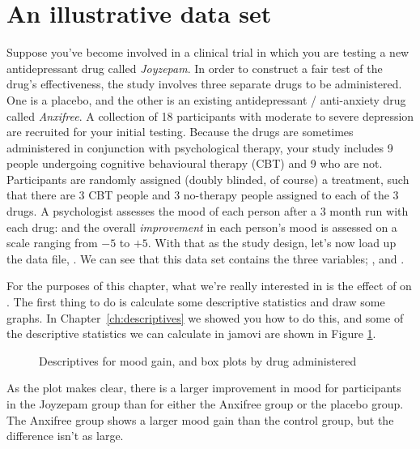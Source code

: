\section{An illustrative data set~\label{sec:anxifree}}

Suppose you've become involved in a clinical trial in which you are testing a new antidepressant drug called {\it Joyzepam}. In order to construct a fair test of the drug's effectiveness, the study involves three separate drugs to be administered. One is a placebo, and the other is an existing antidepressant / anti-anxiety drug called {\it Anxifree}. A collection of 18 participants with moderate to severe depression are recruited for your initial testing. Because the drugs are sometimes administered in conjunction with psychological therapy, your study includes 9 people undergoing cognitive behavioural therapy (CBT) and 9 who are not. Participants are randomly assigned (doubly blinded, of course) a treatment, such that there are 3 CBT people and 3 no-therapy people assigned to each of the 3 drugs. A psychologist assesses the mood of each person after a 3 month run with each drug: and the overall {\it improvement} in each person's mood is assessed on a scale ranging from $-5$ to $+5$.  With that as the study design, let's now load up the data file, . We can see that this data set contains the three variables; ,  and . 

For the purposes of this chapter, what we're really interested in is the effect of  on . The first thing to do is calculate some descriptive statistics and draw some graphs. In Chapter~\ref{ch:descriptives} we showed you how to do this, and some of the descriptive statistics we can calculate in jamovi are shown in Figure \ref{fig:anova1}.


\begin{figure}[h]
\begin{center}
\caption{Descriptives for mood gain, and box plots by drug administered}
\HR
\label{fig:anova1}
\end{center}
\end{figure}

As the plot makes clear, there is a larger improvement in mood for participants in the Joyzepam group than for either the Anxifree group or the placebo group. The Anxifree group shows a larger mood gain than the control group, but the difference isn't as large. 

